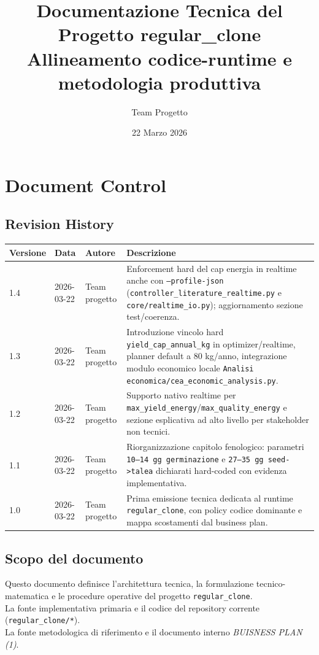 ﻿\documentclass[11pt,a4paper]{report}
\title{
  \vspace{2cm}
  \textbf{Documentazione Tecnica del Progetto regular\_clone}\\
  \large Allineamento codice-runtime e metodologia produttiva
}
\author{Team Progetto}
\date{22 Marzo 2026}
\begin{document}
\maketitle
\tableofcontents
\newpage

\chapter{Document Control}

\section{Revision History}
\begin{longtable}{@{}p{2.2cm}p{2.2cm}p{3.6cm}p{6.8cm}@{}}
\toprule
Versione & Data & Autore & Descrizione \\ \midrule
1.4 & 2026-03-22 & Team progetto & Enforcement hard del cap energia in realtime anche con \texttt{--profile-json} (\texttt{controller\_literature\_realtime.py} e \texttt{core/realtime\_io.py}); aggiornamento sezione test/coerenza. \\
1.3 & 2026-03-22 & Team progetto & Introduzione vincolo hard \texttt{yield\_cap\_annual\_kg} in optimizer/realtime, planner default a 80 kg/anno, integrazione modulo economico locale \texttt{Analisi economica/cea\_economic\_analysis.py}. \\
1.2 & 2026-03-22 & Team progetto & Supporto nativo realtime per \texttt{max\_yield\_energy}/\texttt{max\_quality\_energy} e sezione esplicativa ad alto livello per stakeholder non tecnici. \\
1.1 & 2026-03-22 & Team progetto & Riorganizzazione capitolo fenologico: parametri \texttt{10--14 gg germinazione} e \texttt{27--35 gg seed->talea} dichiarati hard-coded con evidenza implementativa. \\
1.0 & 2026-03-22 & Team progetto & Prima emissione tecnica dedicata al runtime \texttt{regular\_clone}, con policy codice dominante e mappa scostamenti dal business plan. \\
\bottomrule
\end{longtable}

\section{Scopo del documento}
Questo documento definisce l'architettura tecnica, la formulazione tecnico-matematica e le procedure operative del progetto \texttt{regular\_clone}.\\
La fonte implementativa primaria e il codice del repository corrente (\texttt{regular\_clone/*}).\\
La fonte metodologica di riferimento e il documento interno \emph{BUISNESS PLAN (1)}.
\end{document}
